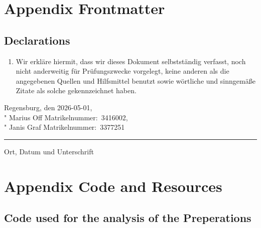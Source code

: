 \documentclass[12pt, oneside, a4paper]{scrreprt}
\begin{document}
    \appendix
        
    \chapter{Appendix Frontmatter}

        \section{Declarations}\label{app:statutory}

            \begin{enumerate}
                \item Wir erkläre hiermit, dass wir dieses Dokument selbstständig verfasst, noch nicht anderweitig für Prüfungszwecke vorgelegt, keine anderen als die angegebenen Quellen und Hilfsmittel benutzt sowie wörtliche und sinngemäße Zitate als solche gekennzeichnet haben.
            \end{enumerate}

            \vskip22mm
            Regensburg, den 2026-05-01, \\
            "\hskip6cm Marius Off\hskip2cm Matrikelnummer:~3416002,\\
            "\hskip6cm Janis Graf\hskip2cm Matrikelnummer:~3377251
            \vskip1mm
            \hrule
            \vskip1mm
            {\footnotesize Ort, Datum und Unterschrift}

            \vspace{12mm}

            \cleardoublepage

        \listoffigures


            \cleardoublepage

    \chapter{Appendix Code and Resources}



            \section{Code used for the analysis of the Preperations}
            
\end{document}
